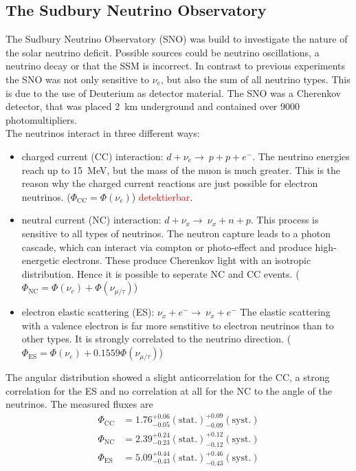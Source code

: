 \subsection{The Sudbury Neutrino Observatory}
The Sudbury Neutrino Observatory (SNO) was build to investigate the nature of the solar neutrino deficit. Possible sources could be neutrino oscillations, a neutrino decay or that the SSM is incorrect. In contrast to previous experiments the SNO was not only sensitive to $\nu_e$, but also the sum of all neutrino types. This is due to the use of Deuterium as detector material. The SNO was a Cherenkov detector, that was placed \SI{2}{\kilo\meter} underground and contained over 9000 photomultipliers.\\
The neutrinos interact in three different ways:
\begin{itemize}
	\item charged current (CC) interaction: $d + \nu_e \rightarrow \ p + p + e^-$.
  The neutrino energies reach up to \SI{15}{\MeV}, but the mass of the muon is much greater. This is the reason why the charged current reactions are just possible for electron neutrinos. ($\Phi_{\text{CC}} = \Phi(\nu_e)$)
  \textcolor{red}{detektierbar}.
  \item neutral current (NC) interaction: $d + \nu_x \rightarrow \ \nu_x + n + p$.
  This process is sensitive to all types of neutrinos. The neutron capture leads to a photon cascade, which can interact via compton or photo-effect and produce high-energetic electrons. These produce Cherenkov light with an isotropic distribution. Hence it is possible to seperate NC and CC events. ($\Phi_{\text{NC}} = \Phi(\nu_e) + \Phi(\nu_{\mu/\tau})$)

  \item electron elastic scattering (ES): $\nu_x + e^- \rightarrow \ \nu_x + e^-$
  The elastic scattering with a valence electron is far more senstitive to electron neutrinos than to other types. It is strongly correlated to the neutrino direction. ($\Phi_{\text{ES}}= \Phi(\nu_e) + 0.1559\Phi(\nu_{\mu/\tau})$)
\end{itemize}
The angular distribution showed a slight anticorrelation for the CC, a strong correlation for the ES and no correlation at all for the NC to the angle of the neutrinos. The measured fluxes are
\begin{align*}
	\Phi_{\text{CC}} &= 1.76^{+0.06}_{-0.05}(\text{stat.})^{+0.09}_{-0.09}(\text{syst.})\\
	\Phi_{\text{NC}} &= 2.39^{+0.24}_{-0.23}(\text{stat.})^{+0.12}_{-0.12}(\text{syst.})\\
	\Phi_{\text{ES}} &= 5.09^{+0.44}_{-0.43}(\text{stat.})^{+0.46}_{-0.43}(\text{syst.})
\end{align*}
